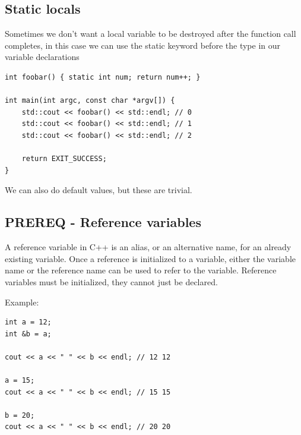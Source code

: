 \documentclass{report}
\begin{document}
    \pagebreak \bigbreak \noindent 
    \subsection{Static locals}
    \bigbreak \noindent 
    Sometimes we don't want a local variable to be destroyed after the function call completes, in this case we can use the static keyword before the type in our variable declarations
    \bigbreak \noindent 
    \sepline
    \begin{verbatim}
int foobar() { static int num; return num++; }

int main(int argc, const char *argv[]) {
    std::cout << foobar() << std::endl; // 0
    std::cout << foobar() << std::endl; // 1
    std::cout << foobar() << std::endl; // 2

    return EXIT_SUCCESS;
}
    \end{verbatim}
    \sepline

    \bigbreak \noindent 
    We can also do default values, but these are trivial.

    \bigbreak \noindent 
    \subsection{PREREQ - Reference variables}
    \bigbreak \noindent 
    \begin{concept}
 A reference variable in C++ is an alias, or an alternative name, for an already existing variable. Once a reference is initialized to a variable, either the variable name or the reference name can be used to refer to the variable. Reference variables must be initialized, they cannot just be declared.
	\end{concept}
    \bigbreak \noindent 
    Example:
    \bigbreak \noindent 
    \sepline
    \begin{verbatim}
int a = 12;
int &b = a; 

cout << a << " " << b << endl; // 12 12

a = 15;
cout << a << " " << b << endl; // 15 15

b = 20; 
cout << a << " " << b << endl; // 20 20

    \end{verbatim}
    \sepline

    \pagebreak \bigbreak \noindent 
\end{document}
